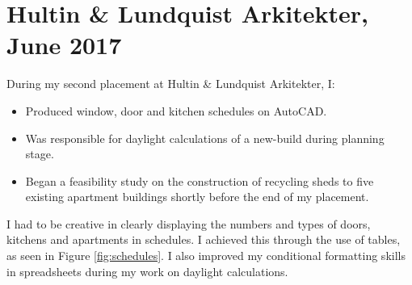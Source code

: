 

\section{Hultin \& Lundquist Arkitekter, June 2017}

During my second placement at Hultin \& Lundquist Arkitekter, I:
\begin{itemize}
	\item Produced window, door and kitchen schedules on AutoCAD.
	\item Was responsible for daylight calculations of a new-build during planning stage.
	\item Began a feasibility study on the construction of recycling sheds to five existing apartment buildings shortly before the end of my placement.
\end{itemize}

I had to be creative in clearly displaying the numbers and types of doors, kitchens and apartments in schedules.
I achieved this through the use of tables, as seen in Figure \ref{fig:schedules}.
I also improved my conditional formatting skills in spreadsheets during my work on daylight calculations.

